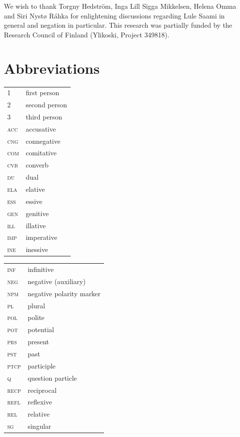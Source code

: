 \documentclass[output=paper,colorlinks,citecolor=brown]{langscibook}
\begin{document}
We wish to thank Torgny Hedström, Inga Lill Sigga Mikkelsen, Helena Omma and Siri Nystø Ráhka for enlightening discussions regarding Lule Saami in general and negation in particular.
This research was partially funded by the Research Council of Finland (Ylikoski, Project 349818).


\section*{Abbreviations}

\begin{tabularx}{.45\textwidth}{lQ}
\textsc{1} & first person \\
\textsc{2} & second person \\
\textsc{3} & third person \\
\textsc{acc} & accusative \\
\textsc{cng} & connegative \\
\textsc{com} & comitative \\
\textsc{cvb} & converb \\
\textsc{du} & dual \\
\textsc{ela} & elative \\
\textsc{ess} & essive \\
\textsc{gen} & genitive \\
\textsc{ill} & illative \\
\textsc{imp} & imperative \\
\textsc{ine} & inessive \\
\end{tabularx}
\begin{tabularx}{.45\textwidth}{lQ}
\textsc{inf} & infinitive \\
\textsc{neg} & negative (auxiliary) \\
\textsc{npm} & negative polarity marker \\
\textsc{pl} & plural \\
\textsc{pol} & polite \\
\textsc{pot} & potential \\
\textsc{prs} & present \\
\textsc{pst} & past \\
\textsc{ptcp} & participle \\
\textsc{q} & question particle \\
\textsc{recp} & reciprocal \\
\textsc{refl} & reflexive \\
\textsc{rel} & relative \\
\textsc{sg} & singular \\
\end{tabularx}

\sloppy\printbibliography[heading=subbibliography,notkeyword=this]
\end{document}

